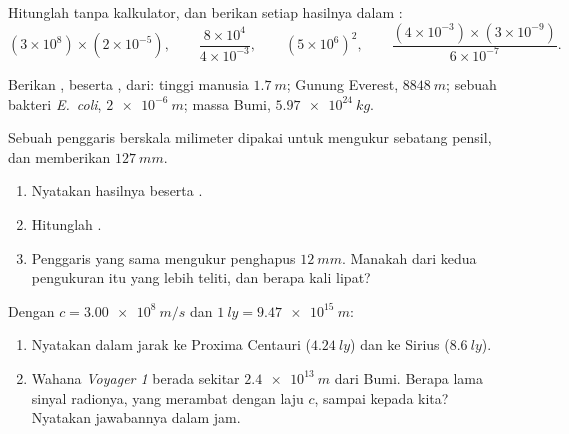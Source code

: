 \begin{exercise}[$\star$]\label{exo:g10:orders-of-magnitude:3}
Hitunglah tanpa kalkulator, dan berikan setiap hasilnya dalam :
\[
(3\times10^{8})\times(2\times10^{-5}), \qquad
\frac{8\times10^{4}}{4\times10^{-3}}, \qquad
(5\times10^{6})^{2}, \qquad
\frac{(4\times10^{-3})\times(3\times10^{-9})}{6\times10^{-7}} .
\]
\end{exercise}

\begin{exercise}[$\star$]\label{exo:g10:orders-of-magnitude:4}
Berikan , beserta , dari: tinggi manusia
$\qty{1.7}{m}$; Gunung Everest, $\qty{8848}{m}$; sebuah bakteri
\emph{E.~coli}, $\qty{2e-6}{m}$; massa Bumi,
$\qty{5.97e24}{kg}$.
\end{exercise}

\begin{exercise}[$\star$]\label{exo:g10:orders-of-magnitude:5}
Sebuah penggaris berskala milimeter dipakai untuk mengukur sebatang
pensil, dan memberikan $\qty{127}{mm}$.
\begin{enumerate}
  \item Nyatakan hasilnya beserta .
  \item Hitunglah .
  \item Penggaris yang sama mengukur penghapus $\qty{12}{mm}$. Manakah
        dari kedua pengukuran itu yang lebih teliti, dan berapa kali
        lipat?
\end{enumerate}
\end{exercise}

\begin{exercise}[$\star\star$]\label{exo:g10:orders-of-magnitude:6}
Dengan $c = \qty{3.00e8}{m/s}$ dan $\qty{1}{ly} = \qty{9.47e15}{m}$:
\begin{enumerate}
  \item Nyatakan dalam  jarak ke Proxima Centauri
        ($\qty{4.24}{ly}$) dan ke Sirius ($\qty{8.6}{ly}$).
  \item Wahana \emph{Voyager 1} berada sekitar $\qty{2.4e13}{m}$ dari
        Bumi. Berapa lama sinyal radionya, yang merambat dengan laju
        $c$, sampai kepada kita? Nyatakan jawabannya dalam jam.
\end{enumerate}
\end{exercise}

